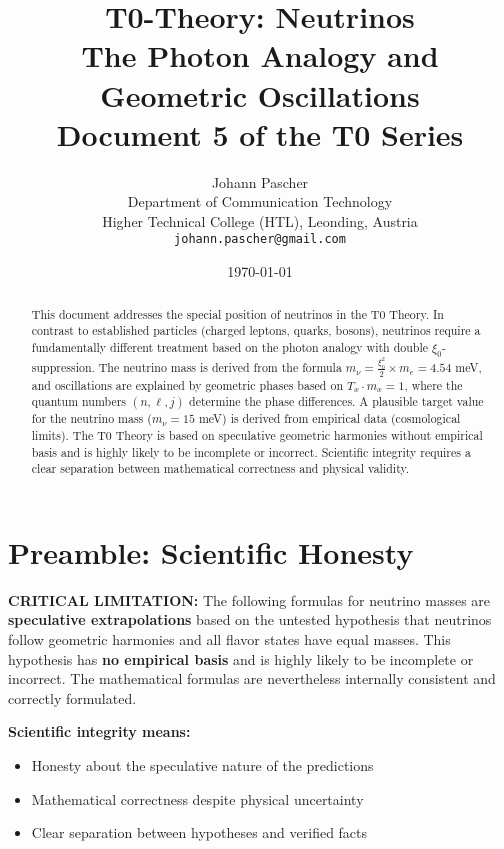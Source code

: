 \documentclass[12pt,a4paper]{article}
\title{\textbf{T0-Theory: Neutrinos}\\[0.5cm]
	\large The Photon Analogy and Geometric Oscillations\\[0.3cm]
	\normalsize Document 5 of the T0 Series}
\author{Johann Pascher\\
	Department of Communication Technology\\
	Higher Technical College (HTL), Leonding, Austria\\
	\texttt{johann.pascher@gmail.com}}
\date{\today}
\begin{document}
	
	\maketitle
	
	\begin{abstract}
		This document addresses the special position of neutrinos in the T0 Theory. In contrast to established particles (charged leptons, quarks, bosons), neutrinos require a fundamentally different treatment based on the photon analogy with double $\xi_0$-suppression. The neutrino mass is derived from the formula $m_\nu = \frac{\xi_0^2}{2} \times m_e = 4.54$ meV, and oscillations are explained by geometric phases based on $T_x \cdot m_x = 1$, where the quantum numbers $(n, \ell, j)$ determine the phase differences. A plausible target value for the neutrino mass ($m_\nu = 15$ meV) is derived from empirical data (cosmological limits). The T0 Theory is based on speculative geometric harmonies without empirical basis and is highly likely to be incomplete or incorrect. Scientific integrity requires a clear separation between mathematical correctness and physical validity.
	\end{abstract}
	
	\tableofcontents
	\newpage
	
	\section{Preamble: Scientific Honesty}
	
	\begin{warning}
		\textbf{CRITICAL LIMITATION:} The following formulas for neutrino masses are \textbf{speculative extrapolations} based on the untested hypothesis that neutrinos follow geometric harmonies and all flavor states have equal masses. This hypothesis has \textbf{no empirical basis} and is highly likely to be incomplete or incorrect. The mathematical formulas are nevertheless internally consistent and correctly formulated.
		
		\vspace{0.5cm}
		\textbf{Scientific integrity means:}
		\begin{itemize}
			\item Honesty about the speculative nature of the predictions
			\item Mathematical correctness despite physical uncertainty
			\item Clear separation between hypotheses and verified facts
		\end{itemize}
	\end{warning}
	
\end{document}
